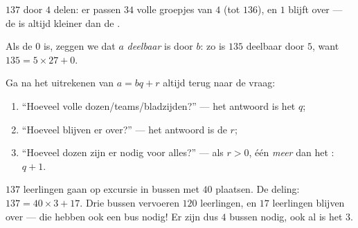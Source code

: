 \begin{omfigure}

{\small $137$ door $4$ delen: er passen $34$ volle groepjes van $4$ (tot
$136$), en $1$ blijft over --- de  is altijd kleiner dan de .}
\end{omfigure}

\begin{definition}[Deelbaar]\label{def:g6:wholes:divisible}
Als de  $0$ is, zeggen we dat $a$ \emph{deelbaar} is door
$b$: zo is $135$ deelbaar door $5$, want $135 = 5 \times 27 + 0$.
\end{definition}

\begin{method}\label{met:g6:wholes:problems}
Ga na het uitrekenen van $a = bq + r$ altijd terug naar de vraag:
\begin{enumerate}
  \item ``Hoeveel volle dozen/teams/bladzijden?'' --- het antwoord is het
         $q$;
  \item ``Hoeveel blijven er over?'' --- het antwoord is de  $r$;
  \item ``Hoeveel dozen zijn er nodig voor alles?'' --- als $r > 0$, één
        \emph{meer} dan het : $q + 1$.
\end{enumerate}
\end{method}

\begin{example}\label{ex:g6:wholes:bus}
$137$ leerlingen gaan op excursie in bussen met $40$ plaatsen. De deling:
$137 = 40 \times 3 + 17$. Drie bussen vervoeren $120$ leerlingen, en $17$
leerlingen blijven over --- die hebben ook een bus nodig! Er zijn dus $4$
bussen nodig, ook al is het  $3$.
\end{example}


